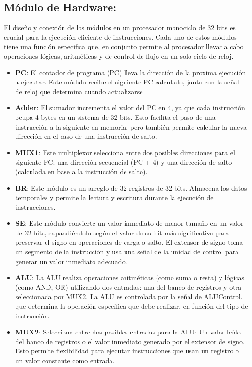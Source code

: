 \documentclass{article}
\begin{document}
\newpage

\subsection{Módulo de Hardware:}
El diseño y conexión de los módulos en un procesador monociclo de 32 bits es crucial para la ejecución eficiente de instrucciones. Cada uno de estos módulos tiene una función especifica que, en conjunto permite al procesador llevar a cabo operaciones lógicas, aritméticas y de control de flujo en un solo ciclo de reloj.

\begin{itemize}
\item \textbf{PC}: El contador de programa (PC) lleva la dirección de la proxima ejecución a ejecutar. Este módulo recibe el siguiente PC calculado, junto con la señal de reloj que determina cuando actualizarse
\item \textbf {Adder}: El sumador incrementa el valor del PC en 4, ya que cada instrucción ocupa 4 bytes en un sistema de 32 bits. Esto facilita el paso de una instrucción a la siguiente en memoria, pero también permite calcular la nueva dirección en el caso de una instrucción de salto.
\item \textbf {MUX1}: Este multiplexor selecciona entre dos posibles direcciones para el siguiente PC: una dirección secuencial (PC + 4) y una dirección de salto (calculada en base a la instrucción de salto).
\item \textbf{BR}: Este módulo es un arreglo de 32 registros de 32 bits. Almacena los datos temporales y permite la lectura y escritura durante la ejecución de instrucciones.
\item \textbf{SE}: Este módulo convierte un valor inmediato de menor tamaño en un valor de 32 bits, expandiéndolo según el valor de su bit más significativo para preservar el signo en operaciones de carga o salto. El extensor de signo toma un segmento de la instrucción y usa una señal de la unidad de control para generar un valor inmediato adecuado.
\item \textbf{ALU}: La ALU realiza operaciones aritméticas (como suma o resta) y lógicas (como AND, OR) utilizando dos entradas: una del banco de registros y otra seleccionada por MUX2. La ALU es controlada por la señal de ALUControl, que determina la operación específica que debe realizar, en función del tipo de instrucción.
\item \textbf{MUX2}: Selecciona entre dos posibles entradas para la ALU: Un valor leído del banco de registros o el valor inmediato generado por el extensor de signo. Esto permite flexibilidad para ejecutar instrucciones que usan un registro o un valor constante como entrada. 

\end{itemize}
\end{document}
